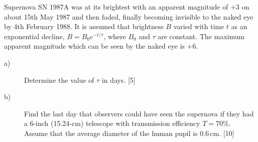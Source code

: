 Supernova SN 1987A was at its brightest with an apparent magnitude of $+3$ on
about 15th May 1987 and then faded, finally becoming invisible to the naked
eye by 4th February 1988. It is assumed that brightness $B$ varied with time
$t$ as an exponential decline, $B = B_0 e^{-t/\tau}$, where $B_0$ and $\tau$
are constant. The maximum apparent magnitude which can be seen by the naked
eye is $+6$.

\begin{description}
\item[a)] Determine the value of $\tau$ in days. \hfill[5]
\item[b)] Find the last day that observers could have seen the supernova if
  they had a 6-inch (15.24-cm) telescope with transmission efficiency
  $T = 70\%$. Assume that the average diameter of the human pupil is
  0.6\,cm. \hfill[10]
\end{description}
